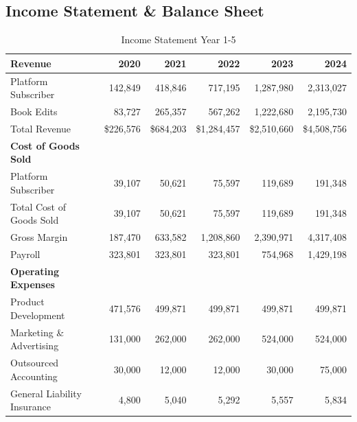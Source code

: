 \documentclass[10pt,openany]{book}
\begin{document}
\begin{landscape}
  \section{Income Statement \& Balance Sheet}
  \begin{center}
    \begin{longtable}[\textwidth]{@{}p{10cm}rrrrr@{}}
      \caption{Income Statement Year 1-5}\tabularnewline
      \toprule
      \textbf{Revenue} & 2020 & 2021 & 2022 & 2023 & 2024 \\
      \midrule
      \hspace{3mm} Platform Subscriber & 142,849 & 418,846 & 717,195 & 1,287,980 & 2,313,027 \\
      \hspace{3mm} Book Edits & 83,727 & 265,357 & 567,262 & 1,222,680 & 2,195,730 \\
      \hspace{3mm} Total Revenue & \$226,576 & \$684,203 & \$1,284,457 & \$2,510,660 & \$4,508,756 \\
      \textbf{Cost of Goods Sold} & & & & & \\
      \midrule
      \hspace{3mm} Platform Subscriber & 39,107 & 50,621 & 75,597 & 119,689 & 191,348 \\
      \hspace{3mm} Total Cost of Goods Sold & 39,107 & 50,621 & 75,597 & 119,689 & 191,348 \\
      \hspace{3mm} Gross Margin & 187,470 & 633,582 & 1,208,860 & 2,390,971 & 4,317,408 \\
      \hspace{3mm} Payroll & 323,801 & 323,801 & 323,801 & 754,968 & 1,429,198 \\
      \textbf{Operating Expenses} & & & & & \\
      \midrule
      \hspace{3mm} Product Development & 471,576 & 499,871 & 499,871 & 499,871 & 499,871 \\
      \hspace{3mm} Marketing \& Advertising & 131,000 & 262,000 & 262,000 & 524,000 & 524,000 \\
      \hspace{3mm} Outsourced Accounting & 30,000 & 12,000 & 12,000 & 30,000 & 75,000 \\
      \hspace{3mm} General Liability Insurance & 4,800 & 5,040 & 5,292 & 5,557 & 5,834 \\

\end{longtable}
\end{center}
\end{landscape}
\end{document}
